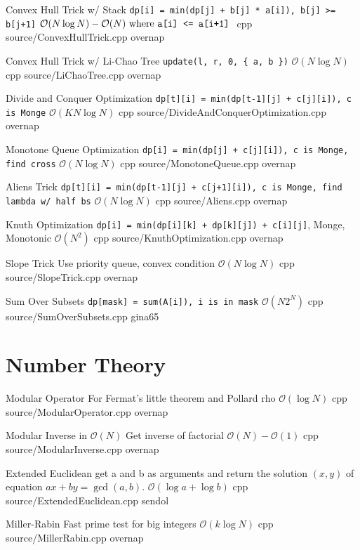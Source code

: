 \documentclass[landscape, 10pt, a4paper, oneside, twocolumn]{extarticle}
\begin{document}
\Algorithm
{Convex Hull Trick w/ Stack}
{\texttt{dp[i] = min(dp[j] + b[j] * a[i]), b[j] >= b[j+1]}}
{$\mathcal{O}(N\log{N})-\mathcal{O}(N)\text{ where \texttt{a[i] <= a[i+1]} }$}
{cpp}
{source/ConvexHullTrick.cpp}
{overnap}

\Algorithm
{Convex Hull Trick w/ Li-Chao Tree}
{\texttt{update(l, r, 0, \{ a, b \})}}
{$\mathcal{O}(N\log{N})$}
{cpp}
{source/LiChaoTree.cpp}
{overnap}

\Algorithm
{Divide and Conquer Optimization}
{\texttt{dp[t][i] = min(dp[t-1][j] + c[j][i]), c is Monge}}
{$\mathcal{O}(KN\log{N})$}
{cpp}
{source/DivideAndConquerOptimization.cpp}
{overnap}

\Algorithm
{Monotone Queue Optimization}
{\texttt{dp[i] = min(dp[j] + c[j][i]), c is Monge, find cross}}
{$\mathcal{O}(N\log{N})$}
{cpp}
{source/MonotoneQueue.cpp}
{overnap}

\Algorithm
{Aliens Trick}
{\texttt{dp[t][i] = min(dp[t-1][j] + c[j+1][i]), c is Monge, find lambda w/ half bs}}
{$\mathcal{O}(N\log{N})$}
{cpp}
{source/Aliens.cpp}
{overnap}

\Algorithm
{Knuth Optimization}
{\texttt{dp[i] = min(dp[i][k] + dp[k][j]) + c[i][j]}, Monge, Monotonic}
{$\mathcal{O}(N^2)$}
{cpp}
{source/KnuthOptimization.cpp}
{overnap}

\Algorithm
{Slope Trick}
{Use priority queue, convex condition}
{$\mathcal{O}(N\log{N})$}
{cpp}
{source/SlopeTrick.cpp}
{overnap}

\Algorithm
{Sum Over Subsets}
{\texttt{dp[mask] = sum(A[i]), i is in mask}}
{$\mathcal{O}(N2^N)$}
{cpp}
{source/SumOverSubsets.cpp}
{gina65}


\section{Number Theory}

\Algorithm
{Modular Operator}
{For Fermat's little theorem and Pollard rho}
{$\mathcal{O}(\log{N})$}
{cpp}
{source/ModularOperator.cpp}
{overnap}

\Algorithm
{Modular Inverse in $\mathcal{O}(N)$}
{Get inverse of factorial}
{$\mathcal{O}(N)-\mathcal{O}(1)$}
{cpp}
{source/ModularInverse.cpp}
{overnap}

\Algorithm
{Extended Euclidean}
{get a and b as arguments and return the solution $(x, y)$ of equation $ax + by = \gcd(a, b)$.}
{$\mathcal{O}(\log{a} + \log{b})$}
{cpp}
{source/ExtendedEuclidean.cpp}
{sendol}

\Algorithm
{Miller-Rabin}
{Fast prime test for big integers}
{$\mathcal{O}(k\log{N})$}
{cpp}
{source/MillerRabin.cpp}
{overnap}
\end{document}
